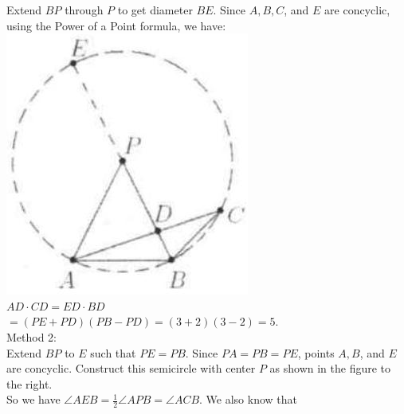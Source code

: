 \documentclass[10pt]{article}
\begin{document}
Extend \(B P\) through \(P\) to get diameter \(B E\). Since \(A, B, C\), and \(E\) are concyclic, using the Power of a Point formula, we have:\\
\includegraphics[max width=\textwidth, center]{2025_04_17_97bc1f7e44d93c271a88g-211(1)}\\
\(A D \cdot C D=E D \cdot B D\)\\
\(=(P E+P D)(P B-P D)=(3+2)(3-2)=5\).\\
Method 2:\\
Extend \(B P\) to \(E\) such that \(P E=P B\). Since \(P A=P B=P E\), points \(A, B\), and \(E\) are concyclic. Construct this semicircle with center \(P\) as shown in the figure to the right.\\
So we have \(\angle A E B=\frac{1}{2} \angle A P B=\angle A C B\). We also know that\\
\end{document}
